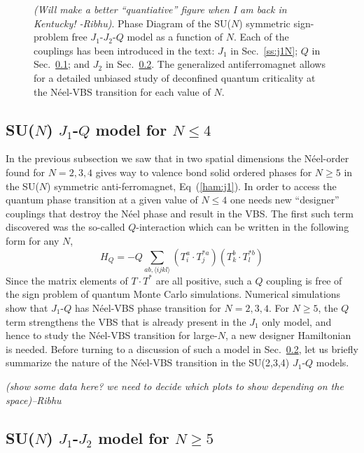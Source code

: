 \documentclass[range]{ar2e}
\begin{document}
\begin{figure}
  \caption{ \label{fig:pdj1j2q} {\em (Will make a better ``quantiative''
      figure when  I am back in Kentucky! -Ribhu)}. Phase Diagram of the
    SU($N$) symmetric sign-problem free
    $J_1$-$J_2$-$Q$ model as a function of $N$. Each of the couplings has been introduced
    in the text: $J_1$ in Sec.~\ref{ss:j1N}; $Q$ in Sec.~\ref{ss:jqN};
  and $J_2$ in Sec.~\ref{ss:j1j2N}. The generalized antiferromagnet
  allows for a detailed unbiased study of deconfined quantum
  criticality at the N\'eel-VBS transition for each value of $N$. }
\end{figure}


\subsection{SU($N$) $J_1$-$Q$ model for $N\leq 4$}
\label{ss:jqN}
In the previous subsection we saw that in two spatial dimensions the
N\'eel-order found for $N=2,3,4$ gives way to valence bond solid
ordered phases for $N\geq 5$ in the SU($N$) symmetric
anti-ferromagnet, Eq~(\ref{ham:j1}). In order to access the quantum
phase transition at a given value of $N\leq 4$ one needs new
``designer'' couplings that
destroy the N\'eel phase and result in the VBS. The first such term discovered was
the so-called $Q$-interaction which can be written in the following
form for any $N$,
\begin{equation}
H_{Q} = - Q \sum_{ab,\langle ijkl \rangle} \left ( T^a_i\cdot
  T^{*a}_j\right ) \left ( T^b_k\cdot T^{*b}_l \right )
\end{equation}
Since the matrix elements of $T\cdot T^*$ are all positive, such a $Q$
coupling is free of the sign problem of quantum Monte Carlo
simulations. Numerical simulations show that $J_1$-$Q$ has N\'eel-VBS
phase transition for $N=2,3,4$. For $N\geq 5$, the $Q$ term strengthens
the VBS that is already present in the $J_1$ only model, and hence to
study the N\'eel-VBS transition for large-$N$, a new designer
Hamiltonian is needed. Before turning to a discussion of such a model in
Sec.~\ref{ss:j1j2N}, let us briefly summarize the nature of the
N\'eel-VBS transition in the SU(2,3,4) $J_1$-$Q$ models.

{\em (show some data here? we need to decide which plots to show
  depending on the space)--Ribhu}

\subsection{SU($N$) $J_1$-$J_2$ model for $N\geq 5$}
\label{ss:j1j2N}
\end{document}

